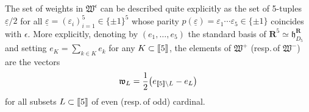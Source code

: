\documentclass[11pt]{amsart}
\begin{document}
The set of weights in $\mathfrak W^\epsilon$ can be described quite explicitly as the set 
of 5-tuples $\underline{\varepsilon}/2$ for all $\underline{\varepsilon}=(\varepsilon_i)_{i=1}^{5}\in \{ \pm 1\}^5$ whose parity $p(\underline{\varepsilon})=\varepsilon_1\cdots
\varepsilon_5\in \{\pm1\}$ coincides with $\epsilon$.  More explicitly, denoting by $(e_1,\ldots,e_5)$ the standard basis of $\mathbf R^5\simeq \mathfrak h_{D_5}^{\mathbf R}$
 and setting $e_K=\sum_{k \in K} e_k$ for any $K\subset  [\hspace{-0,05cm}[5]\hspace{-0,05cm}]$, the elements of $\mathfrak W^+$ (resp.\,of $\mathfrak W^-$) are the vectors 
\begin{equation}
\label{Eq:weight-vectors}
\mathfrak w_L=\frac12 \big(  e_{[\hspace{-0,05cm}[5]\hspace{-0,05cm}]\setminus L}-e_L\big) 
\end{equation}
for all subsets $L\subset  [\hspace{-0,05cm}[5]\hspace{-0,05cm}]$ of even (resp.\,of odd) cardinal. 





\end{document}
